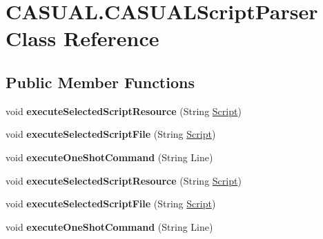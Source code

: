 \hypertarget{classCASUAL_1_1CASUALScriptParser}{\section{C\-A\-S\-U\-A\-L.\-C\-A\-S\-U\-A\-L\-Script\-Parser Class Reference}
\label{classCASUAL_1_1CASUALScriptParser}
}
\subsection*{Public Member Functions}
\begin{DoxyCompactItemize}
\item 
\hypertarget{classCASUAL_1_1CASUALScriptParser_a1cdb36f0abcb04d969cf30be504e9bd9}{void {\bfseries execute\-Selected\-Script\-Resource} (String \hyperlink{classCASUAL_1_1caspac_1_1Script}{Script})}\label{classCASUAL_1_1CASUALScriptParser_a1cdb36f0abcb04d969cf30be504e9bd9}

\item 
\hypertarget{classCASUAL_1_1CASUALScriptParser_a25b767d273a1366373d6a218759d6945}{void {\bfseries execute\-Selected\-Script\-File} (String \hyperlink{classCASUAL_1_1caspac_1_1Script}{Script})}\label{classCASUAL_1_1CASUALScriptParser_a25b767d273a1366373d6a218759d6945}

\item 
\hypertarget{classCASUAL_1_1CASUALScriptParser_ab303a8995ae16b45f465759febc3e461}{void {\bfseries execute\-One\-Shot\-Command} (String Line)}\label{classCASUAL_1_1CASUALScriptParser_ab303a8995ae16b45f465759febc3e461}

\item 
\hypertarget{classCASUAL_1_1CASUALScriptParser_a1cdb36f0abcb04d969cf30be504e9bd9}{void {\bfseries execute\-Selected\-Script\-Resource} (String \hyperlink{classCASUAL_1_1caspac_1_1Script}{Script})}\label{classCASUAL_1_1CASUALScriptParser_a1cdb36f0abcb04d969cf30be504e9bd9}

\item 
\hypertarget{classCASUAL_1_1CASUALScriptParser_a25b767d273a1366373d6a218759d6945}{void {\bfseries execute\-Selected\-Script\-File} (String \hyperlink{classCASUAL_1_1caspac_1_1Script}{Script})}\label{classCASUAL_1_1CASUALScriptParser_a25b767d273a1366373d6a218759d6945}

\item 
\hypertarget{classCASUAL_1_1CASUALScriptParser_ab303a8995ae16b45f465759febc3e461}{void {\bfseries execute\-One\-Shot\-Command} (String Line)}\label{classCASUAL_1_1CASUALScriptParser_ab303a8995ae16b45f465759febc3e461}


\end{DoxyCompactItemize}
